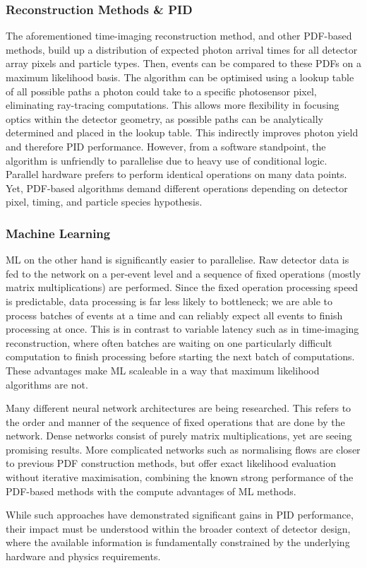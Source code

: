 \subsubsection{\label{sec:reconstruction-methods}Reconstruction Methods \& PID}

The aforementioned time-imaging reconstruction method, and other PDF-based methods, build up a distribution of expected photon arrival times for all detector array pixels and particle types. Then, events can be compared to these PDFs on a maximum likelihood basis. The algorithm can be optimised using a lookup table of all possible paths a photon could take to a specific photosensor pixel, eliminating ray-tracing computations. 
This allows more flexibility in focusing optics within the detector geometry, as possible paths can be analytically determined and placed in the lookup table. This indirectly improves photon yield and therefore PID performance.\nolinebreak\cite{time-imaging-roman_2020}
However, from a software standpoint, the algorithm is unfriendly to parallelise due to heavy use of conditional logic. 
Parallel hardware prefers to perform identical operations on many data points. Yet, PDF-based algorithms demand different operations depending on detector pixel, timing, and particle species hypothesis.

\subsubsection{\label{sec:machine-learning}Machine Learning}

ML on the other hand is significantly easier to parallelise. Raw detector data is fed to the network on a per-event level and a sequence of fixed operations (mostly matrix multiplications) are performed. Since the fixed operation processing speed is predictable, data processing is far less likely to bottleneck; we are able to process batches of events at a time and can reliably expect all events to finish processing at once. This is in contrast to variable latency such as in time-imaging reconstruction, where often batches are waiting on one particularly difficult computation to finish processing before starting the next batch of computations. These advantages make ML scaleable in a way that maximum likelihood algorithms are not. 

Many different neural network architectures are being researched. This refers to the order and manner of the sequence of fixed operations that are done by the network. Dense networks consist of purely matrix multiplications, yet are seeing promising results.\nolinebreak\cite{film-networks-markhoff_2026} More complicated networks such as normalising flows are closer to previous PDF construction methods, but offer exact likelihood evaluation without iterative maximisation, combining the known strong performance of the PDF-based methods with the compute advantages of ML methods.\nolinebreak\cite{Fanelli_2025} 

While such approaches have demonstrated significant gains in PID performance, their impact must be understood within the broader context of detector design, where the available information is fundamentally constrained by the underlying hardware and physics requirements.
